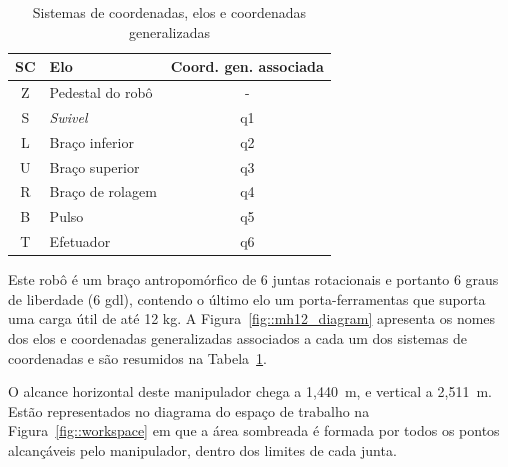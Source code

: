 \begin{table}[h]
\centering
\caption{Sistemas de coordenadas, elos e coordenadas generalizadas}
\label{tab::resumo_mh12}
\begin{tabular}{@{}clc@{}}
\toprule
SC & Elo              & \multicolumn{1}{l}{Coord. gen. associada} \\ \midrule
Z  & Pedestal do robô & -                                         \\
S  & \textit{Swivel}  & q1                                        \\
L  & Braço inferior   & q2                                        \\
U  & Braço superior   & q3                                        \\
R  & Braço de rolagem & q4                                        \\
B  & Pulso            & q5                                        \\
T  & Efetuador        & q6                                        \\ \bottomrule
\end{tabular}
\end{table}

Este robô é um braço antropomórfico de 6 juntas rotacionais e portanto 6 graus
de liberdade (6 gdl), contendo o último elo um porta-ferramentas que suporta uma
carga útil de até 12 kg. A Figura~\ref{fig::mh12_diagram} apresenta os nomes dos
elos e coordenadas generalizadas associados a cada um dos sistemas de
coordenadas e são resumidos na Tabela~\ref{tab::resumo_mh12}.

O alcance horizontal deste manipulador chega a 1,440~m, e vertical a
2,511~m. Estão representados no diagrama do espaço de trabalho na
Figura~\ref{fig::workspace} em que a área sombreada é formada por todos os
pontos alcançáveis pelo manipulador, dentro dos limites de cada junta.

